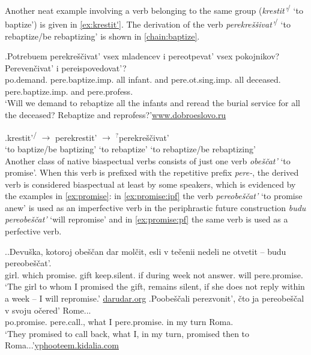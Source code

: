 Another neat example involving a verb belonging to the same group (\textit{krestit'}\textsuperscript{\IPF\slash\PF} `to baptize') is given in \ref{ex:krestit'}. The derivation of the verb \textit{perekre\v{s}\v{s}ivat'}\textsuperscript{\IPF\slash\PF} `to rebaptize/be rebaptizing' is shown in \ref{chain:baptize}.

\exg.\label{ex:krestit'}Potrebuem perekre\v{s}\v{c}ivat' vsex mladencev i pereotpevat' vsex pokojnikov? Pereven\v{c}ivat' i pereispovedovat'?\\
po.demand. pere.baptize.imp. all infant. and pere.ot.sing.imp. all deceased. pere.baptize.imp. and pere.profess.\\
\trans `Will we demand to rebaptize all the infants and reread the burial service for all the deceased? Rebaptize and reprofess?'\hbox{}\hfill\hbox{\url{www.dobroeslovo.ru}}


\exg.\label{chain:baptize}krestit'\textsuperscript{\IPF\slash\PF} $\rightarrow$ perekrestit'\textsuperscript{\PF} $\rightarrow$ $^?$perekre\v{s}\v{c}ivat'\textsuperscript{\IPF}\\
{`to baptize/be baptizing'} {} {`to rebaptize'} {} {`to rebaptize/be rebaptizing'}\\

Another class of native biaspectual verbs consists of just one verb \textit{obe\v{s}\v{c}at'} `to promise'. When this verb is prefixed with the repetitive prefix \textit{pere-}, the derived verb is considered biaspectual at least by some speakers, which is evidenced by the examples in \ref{ex:promise}: in \ref{ex:promise:ipf} the verb \textit{pereobe\v{s}\v{c}at'} `to promise anew' is used as an imperfective verb in the periphrastic future construction \textit{budu pereobe\v{s}\v{c}at'} `will repromise' and in \ref{ex:promise:pf} the same verb is used as a perfective verb. 

\ex.\label{ex:promise}\ag.\label{ex:promise:ipf}Devu\v{s}ka, kotoroj obe\v{s}\v{c}an dar mol\v{c}it, esli {v te\v{c}enii} nedeli ne otvetit -- budu pereobe\v{s}\v{c}at'.\\
girl. which promise. gift keep.silent. if during week not answer.  will pere.promise.\\
\trans `The girl to whom I promised the gift, remains silent, if she does not reply within a week -- I will repromise.'
\hbox{}\hfill\hbox{\url{darudar.org}}
\bg.\label{ex:promise:pf}Poobe\v{s}\v{c}ali perezvonit', \v{c}to ja pereobe\v{s}\v{c}al v svoju o\v{c}ered' Rome...\\
po.promise. pere.call., what I pere.promise. in my turn Roma.\\
\trans `They promised to call back, what I, in my turn, promised then to Roma...'\hbox{}\hfill\hbox{\url{yphooteem.kidalia.com}}

